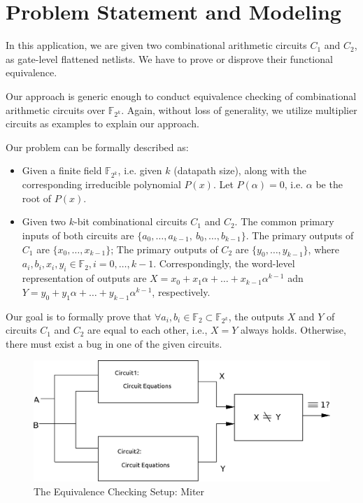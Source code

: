 \section{Problem Statement and Modeling}

In this application, we are given two combinational arithmetic circuits $C_{1}$ and $C_{2}$, as gate-level flattened netlists.
We have to prove or disprove their functional equivalence. 

Our approach is generic enough to conduct equivalence checking of combinational arithmetic circuits over $\mathbb{F}_{2^k}$.
Again, without loss of generality, we utilize multiplier circuits as examples to explain our approach.

Our problem can be formally described as:

\begin{itemize}
\item Given a finite field $\mathbb{F}_{2^k}$, i.e. given $k$ (datapath size), along with the
  corresponding irreducible polynomial $P(x)$. Let $P(\alpha) = 0$, i.e. $\alpha$ be the root of $P(x)$.  
\item  Given two $k$-bit combinational circuits $C_{1}$ and $C_{2}$. 
		The common primary inputs of both circuits are $\{a_0, \dots, a_{k-1}, ~b_0,\dots, b_{k-1}\}$. 
		The primary outputs of $C_{1}$ are $\{x_0, \dots, x_{k-1}\}$;
		The primary outputs of $C_{2}$ are $\{y_0, \dots, y_{k-1}\}$, 
		where $a_i, b_i, x_i, y_i\in \mathbb{F}_2, i = 0, \dots, k-1$.
		Correspondingly, the word-level representation of outputs are
		$X = x_0 + x_1\alpha  + \dots +  x_{k-1}\alpha^{k-1}$ adn $Y = y_0 + y_1\alpha  + \dots +  y_{k-1}\alpha^{k-1}$, respectively.
\end{itemize}
Our goal is to formally prove that $\forall a_{i},b_{i} \in \mathbb{F}_{2} \subset \mathbb{F}_{2^k}$,
the outputs $X$ and $Y$ of circuits $C_{1}$ and $C_{2}$ are equal to each other, 
i.e., $ X=Y$ always holds. Otherwise, there must exist a bug in one of the given circuits.  


\begin{figure}[htb]
\centerline{
\includegraphics[scale=0.3]{./figures/miter.eps}
}
\caption{The Equivalence Checking Setup: Miter}
\label{fig:miter}
\end{figure}

